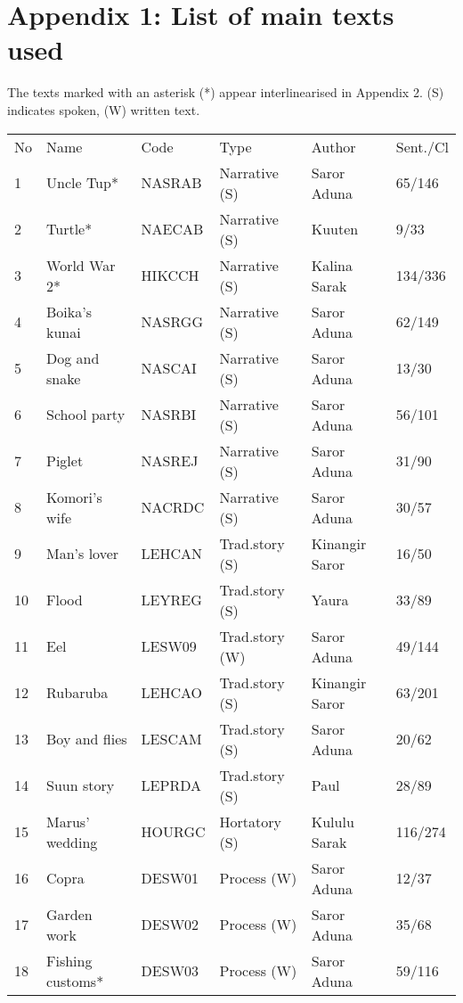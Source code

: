 
\section*{Appendix 1: List of main texts used}


The texts marked with an asterisk (*) appear interlinearised in Appendix 2.
{(S) indicates spoken, (W) written text.}

\begin{tabular}{llllll}
No &  Name & Code & Type & Author & Sent./Cl\\
1 & Uncle Tup* &  \textsc{NASRAB} & Narrative (S) &  Saror Aduna &  65/146\\
2 & Turtle*  & \textsc{NAECAB} & Narrative (S) & Kuuten  & 9/33 \\
3 & World War 2*  & \textsc{HIKCCH} & Narrative (S) & Kalina Sarak  & 134/336 \\
4 & Boika's kunai  & \textsc{NASRGG} & Narrative (S) & Saror Aduna  & 62/149 \\
5 & Dog and snake  & \textsc{NASCAI} & Narrative (S) & Saror Aduna  & 13/30 \\
6 & School party  & \textsc{NASRBI} & Narrative (S) & Saror Aduna  & 56/101 \\
7 & Piglet  & \textsc{NASREJ} & Narrative (S) & Saror Aduna  & 31/90 \\
8 & Komori's wife  & \textsc{NACRDC} & Narrative (S) & Saror Aduna  & 30/57 \\
9 & Man's lover  & \textsc{LEHCAN} & Trad.story (S) & Kinangir Saror  & 16/50 \\
10 & Flood  & \textsc{LEYREG} & Trad.story (S) & Yaura  & 33/89 \\
11 & Eel  & LESW09 & Trad.story (W) & Saror Aduna  & 49/144 \\
12 & Rubaruba  & \textsc{LEHCAO} & Trad.story (S) & Kinangir Saror  & 63/201 \\
13 & Boy and flies  & \textsc{LESCAM} & Trad.story (S) & Saror Aduna  & 20/62 \\
14 & Suun story  & \textsc{LEPRDA} & Trad.story (S) & Paul  & 28/89 \\
15 & Marus' wedding  & \textsc{HOURGC} & Hortatory (S) & Kululu Sarak  & 116/274 \\
16 & Copra  & DESW01 & Process (W) & Saror Aduna  & 12/37 \\
17 & Garden work  & DESW02 & Process (W) & Saror Aduna  & 35/68 \\
18 & Fishing customs*  & DESW03 & Process (W) & Saror Aduna  & 59/116 \\

\end{tabular}
